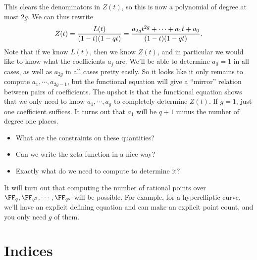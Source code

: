 This clears the denominators in \(Z(t)\), so this is now a polynomial of
degree at most \(2g\). We can thus rewrite
\begin{align*}  
Z(t) = {L(t) \over (1-t)(1-qt)} = {a_{2g} t^{2g} + \cdots + a_1 t + a_0 \over (1-t)(1-qt)}
.\end{align*} Note that if we know \(L(t)\), then we know \(Z(t)\), and
in particular we would like to know what the coefficients \(a_j\) are.
We'll be able to determine \(a_0 = 1\) in all cases, as well as
\(a_{2g}\) in all cases pretty easily. So it looks like it only remains
to compute \(a_1, \cdots, a_{2g-1}\), but the functional equation will
give a ``mirror'' relation between pairs of coefficients. The upshot is
that the functional equation shows that we only need to know
\(a_1, \cdots, a_g\) to completely determine \(Z(t)\). If \(g=1\), just
one coefficient suffices. It turns out that \(a_1\) will be \(q+1\)
minus the number of degree one places.

\begin{question}

\envlist

\begin{itemize}
\item
  What are the constraints on these quantities?
\item
  Can we write the zeta function in a nice way?
\item
  Exactly what do we need to compute to determine it?
\end{itemize}

\end{question}

It will turn out that computing the number of rational points over
\(\FF_{q}, \FF_{q^2}, \cdots, \FF_{q^g}\) will be possible. For example,
for a hyperelliptic curve, we'll have an explicit defining equation and
can make an explicit point count, and you only need \(g\) of them.

\section{Indices}
\newpage

\renewcommand{\listtheoremname}{Definitions}
\listoftheorems[ignoreall,show={definition}, numwidth=3.5em]

\renewcommand{\listtheoremname}{Theorems}
\listoftheorems[ignoreall,show={theorem,proposition}, numwidth=3.5em]

\renewcommand{\listtheoremname}{Exercises}
\listoftheorems[ignoreall,show={exercise}, numwidth=3.5em]

\listoffigures


\printbibliography[title=Bibliography]



